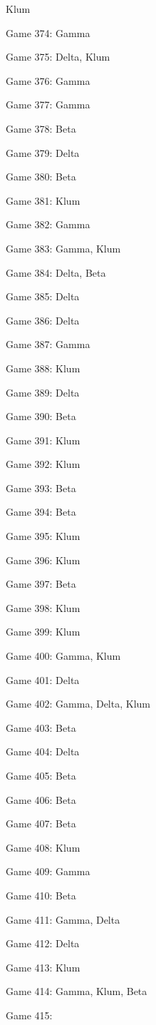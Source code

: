 \documentclass{article}
\begin{document}
\begin{multicols}{3}
\begin{compactitem}
Klum
\item Game 374:
Gamma
\item Game 375:
Delta, Klum
\item Game 376:
Gamma
\item Game 377:
Gamma
\item Game 378:
Beta
\item Game 379:
Delta
\item Game 380:
Beta
\item Game 381:
Klum
\item Game 382:
Gamma
\item Game 383:
Gamma, Klum
\item Game 384:
Delta, Beta
\item Game 385:
Delta
\item Game 386:
Delta
\item Game 387:
Gamma
\item Game 388:
Klum
\item Game 389:
Delta
\item Game 390:
Beta
\item Game 391:
Klum
\item Game 392:
Klum
\item Game 393:
Beta
\item Game 394:
Beta
\item Game 395:
Klum
\item Game 396:
Klum
\item Game 397:
Beta
\item Game 398:
Klum
\item Game 399:
Klum
\item Game 400:
Gamma, Klum
\item Game 401:
Delta
\item Game 402:
Gamma, Delta, Klum
\item Game 403:
Beta
\item Game 404:
Delta
\item Game 405:
Beta
\item Game 406:
Beta
\item Game 407:
Beta
\item Game 408:
Klum
\item Game 409:
Gamma
\item Game 410:
Beta
\item Game 411:
Gamma, Delta
\item Game 412:
Delta
\item Game 413:
Klum
\item Game 414:
Gamma, Klum, Beta
\item Game 415:

\end{compactitem}
\end{multicols}
\end{document}
